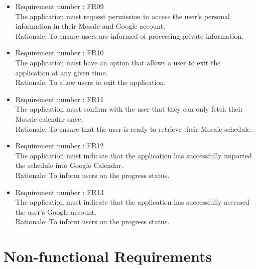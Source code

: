 \documentclass[12pt, titlepage]{article}
\begin{document}
\begin{itemize}
\color{black}
\item Requirement number : FR09\\
The application must request permission to access the user's personal information in their Mosaic and Google account. \\
Rationale: To ensure users are informed of processing private information.
\item Requirement number : FR10\\
The application must have an option that allows a user to exit the application at any given time.\\
Rationale: To  allow users to exit the application.

\color{blue}
\item Requirement number : FR11\\
The application must confirm with the user that they can only fetch their Mosaic calendar once.\\
Rationale: To  ensure that the user is ready to retrieve their Mosaic schedule.

\item Requirement number : FR12\\
The application must indicate that the application has successfully imported the schedule into Google Calendar.\\
Rationale: To inform users on the progress status.

\item Requirement number : FR13\\
The application must indicate that the application has successfully accessed the user's Google account.\\
Rationale: To inform users on the progress status.
\color{black}

\end{itemize}

\section{Non-functional Requirements}
\end{document}

